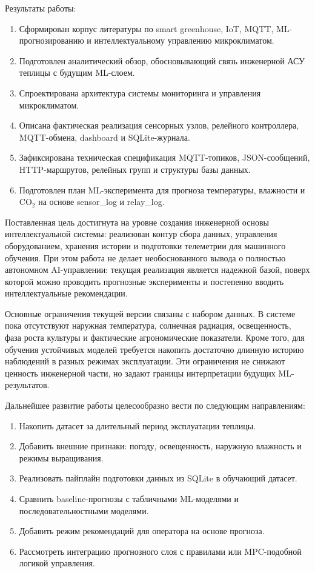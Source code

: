 \documentclass[a4paper,14pt]{extarticle}
\renewcommand{\texttt}[1]{\textnormal{#1}}
\providecommand{\tightlist}{%
  \setlength{\itemsep}{0pt}\setlength{\parskip}{0pt}}
\begin{document}
Результаты работы:

\begin{enumerate}
\def\labelenumi{\arabic{enumi})}
\tightlist
\item
  Сформирован корпус литературы по smart greenhouse, IoT, MQTT,
  ML-прогнозированию и интеллектуальному управлению микроклиматом.
\item
  Подготовлен аналитический обзор, обосновывающий связь инженерной АСУ
  теплицы с будущим ML-слоем.
\item
  Спроектирована архитектура системы мониторинга и управления
  микроклиматом.
\item
  Описана фактическая реализация сенсорных узлов, релейного контроллера,
  MQTT-обмена, dashboard и SQLite-журнала.
\item
  Зафиксирована техническая спецификация MQTT-топиков, JSON-сообщений,
  HTTP-маршрутов, релейных групп и структуры базы данных.
\item
  Подготовлен план ML-эксперимента для прогноза температуры, влажности и
  CO\(_2\) на основе \texttt{sensor\_log} и \texttt{relay\_log}.
\end{enumerate}

Поставленная цель достигнута на уровне создания инженерной основы
интеллектуальной системы: реализован контур сбора данных, управления
оборудованием, хранения истории и подготовки телеметрии для машинного
обучения. При этом работа не делает необоснованного вывода о полностью
автономном AI-управлении: текущая реализация является надежной базой,
поверх которой можно проводить прогнозные эксперименты и постепенно
вводить интеллектуальные рекомендации.

Основные ограничения текущей версии связаны с набором данных. В системе
пока отсутствуют наружная температура, солнечная радиация, освещенность,
фаза роста культуры и фактические агрономические показатели. Кроме того,
для обучения устойчивых моделей требуется накопить достаточно длинную
историю наблюдений в разных режимах эксплуатации. Эти ограничения не
снижают ценность инженерной части, но задают границы интерпретации
будущих ML-результатов.

Дальнейшее развитие работы целесообразно вести по следующим
направлениям:

\begin{enumerate}
\def\labelenumi{\arabic{enumi})}
\tightlist
\item
  Накопить датасет за длительный период эксплуатации теплицы.
\item
  Добавить внешние признаки: погоду, освещенность, наружную влажность и
  режимы выращивания.
\item
  Реализовать пайплайн подготовки данных из SQLite в обучающий датасет.
\item
  Сравнить baseline-прогнозы с табличными ML-моделями и
  последовательностными моделями.
\item
  Добавить режим рекомендаций для оператора на основе прогноза.
\item
  Рассмотреть интеграцию прогнозного слоя с правилами или MPC-подобной
  логикой управления.
\end{enumerate}
\end{document}
